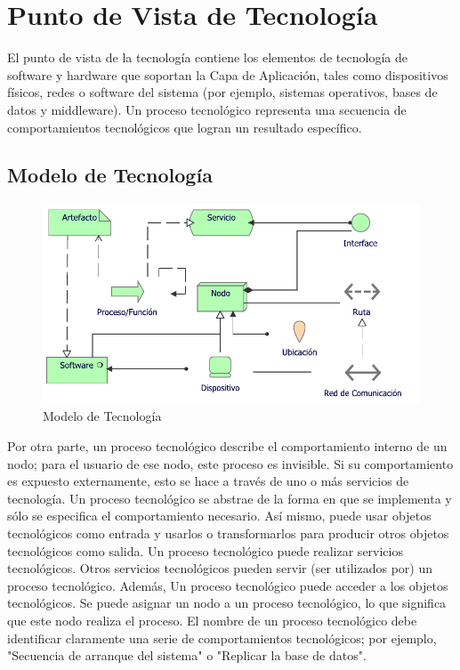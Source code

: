 \section{Punto de Vista de Tecnología}

El punto de vista de la tecnología contiene los elementos de tecnología de software y hardware que soportan la Capa de Aplicación, tales como dispositivos físicos, redes o software del sistema (por ejemplo, sistemas operativos, bases de datos y middleware). Un proceso tecnológico representa una secuencia de comportamientos tecnológicos que logran un resultado específico.

\subsection{Modelo de Tecnología}
\begin{figure}[h!]
	\centering
	\includegraphics[width=.8\linewidth]{imgs/modelo/tecnologia}
	\caption{Modelo de Tecnología}
\end{figure}

Por otra parte, un proceso tecnológico describe el comportamiento interno de un nodo; para el usuario de ese nodo, este proceso es invisible. Si su comportamiento es expuesto externamente, esto se hace a través de uno o más servicios de tecnología. Un proceso tecnológico se abstrae de la forma en que se implementa y sólo se especifica el comportamiento necesario. Así mismo, puede usar objetos tecnológicos como entrada y usarlos o transformarlos para producir otros objetos tecnológicos como salida. Un proceso tecnológico puede realizar servicios tecnológicos. Otros servicios tecnológicos pueden servir (ser utilizados por) un proceso tecnológico. Además, Un proceso tecnológico puede acceder a los objetos tecnológicos. Se puede asignar un nodo a un proceso tecnológico, lo que significa que este nodo realiza el proceso. El nombre de un proceso tecnológico debe identificar claramente una serie de comportamientos tecnológicos; por ejemplo, "Secuencia de arranque del sistema" o "Replicar la base de datos".

